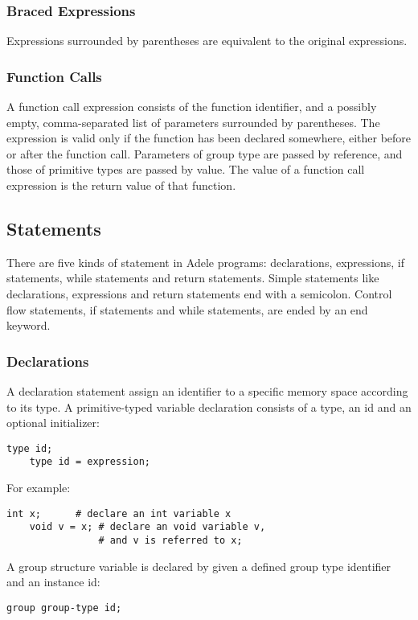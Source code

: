 \documentclass[11pt,letterpaper]{article}
\begin{document}
\subsubsection {Braced Expressions}
Expressions surrounded by parentheses are equivalent to the original expressions.

\subsubsection {Function Calls}
A function call expression consists of the function identifier, and a possibly empty, comma-separated list of parameters surrounded by parentheses. The expression is valid only if the function has been declared somewhere, either before or after the function call. Parameters of group type are passed by reference, and those of primitive types are passed by value. The value of a function call expression is the return value of that function.

\subsection {Statements}
There are five kinds of statement in Adele programs: declarations, expressions, if statements, while statements and return statements. Simple statements like declarations, expressions and return statements end with a semicolon. Control flow statements, if statements and while statements, are ended by an end keyword.

\subsubsection {Declarations}
A declaration statement assign an identifier to a specific memory space according to its type. A primitive-typed variable declaration consists of a type, an id and an optional initializer:
\begin{lstlisting}[tabsize=4]
	type id;
	type id = expression;
\end{lstlisting}

For example:
\begin{lstlisting}[tabsize=4]
	int x; 		# declare an int variable x
	void v = x; # declare an void variable v, 
                # and v is referred to x;
\end{lstlisting}

A group structure variable is declared by given a defined group type identifier and an instance id:
\begin{lstlisting}[tabsize=4]
	group group-type id;
\end{lstlisting}
\end{document}
